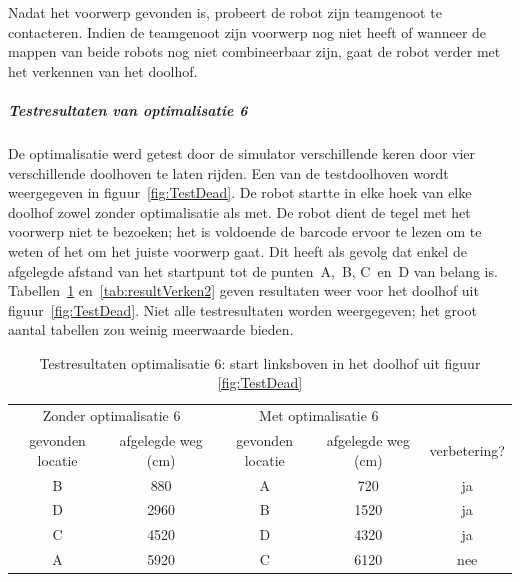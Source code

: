 \documentclass[eind]{penoverslag}
\begin{document}
Nadat het voorwerp gevonden is, probeert de robot zijn teamgenoot te contacteren. Indien de teamgenoot zijn voorwerp nog niet heeft of wanneer de mappen van beide robots nog niet combineerbaar zijn, gaat de robot verder met het verkennen van het doolhof.

\subparagraph{Testresultaten van optimalisatie 6}
\label{par:AlgoZoekTest}

De optimalisatie werd getest door de simulator verschillende keren door vier verschillende doolhoven te laten rijden. Een van de testdoolhoven wordt weergegeven in figuur~\ref{fig:TestDead}. De robot startte in elke hoek van elke doolhof zowel zonder optimalisatie als met. De robot dient de tegel met het voorwerp niet te bezoeken; het is voldoende de barcode ervoor te lezen om te weten of het om het juiste voorwerp gaat. Dit heeft als gevolg dat enkel de afgelegde afstand van het startpunt tot de punten~A,~B, C~en~D van belang is. Tabellen~\ref{tab:resultVerken1} en~\ref{tab:resultVerken2} geven resultaten weer voor het doolhof uit figuur~\ref{fig:TestDead}. Niet alle testresultaten worden weergegeven; het groot aantal tabellen zou weinig meerwaarde bieden.\\

\begin{table}[h]
\begin{center}
    \begin{tabular}{ c | c | c | c | c}
   \multicolumn{2}{c|}{Zonder optimalisatie 6} & \multicolumn{2}{|c|}{Met optimalisatie 6} & \\
     gevonden locatie & afgelegde weg (cm) & gevonden locatie &  afgelegde weg (cm) & verbetering?\\ \hline\hline
    B & 880 & A & 720 & ja \\ \hline
    D & 2960 & B & 1520 & ja \\ \hline
    C & 4520 & D & 4320 & ja\\ \hline
    A & 5920 & C & 6120 & nee\\
    \end{tabular}
    \caption{Testresultaten optimalisatie 6: start linksboven in het doolhof uit figuur \ref{fig:TestDead}}
    \label{tab:resultVerken1}
\end{center}
\end{table}
\end{document}
